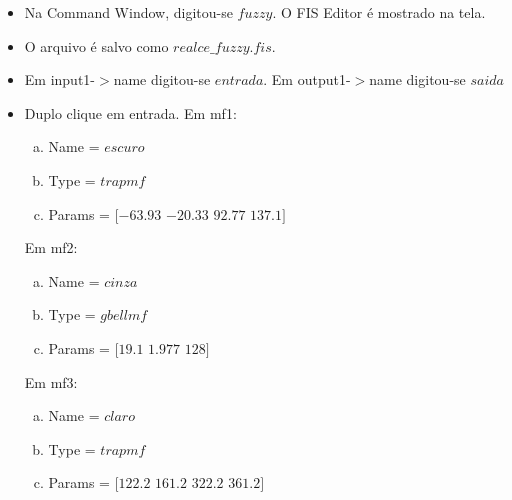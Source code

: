 \documentclass[conference]{IEEEtran}
\begin{document}
\begin{itemize}
	\item Na Command Window, digitou-se $fuzzy$. O FIS Editor \'e mostrado na tela.
	\item O arquivo \'e salvo como $realce\_fuzzy.fis$.
	\item Em input1-$>$name digitou-se $entrada$.  Em output1-$>$name digitou-se $saida$
	\item Duplo clique em entrada. Em mf1: 
		\begin{enumerate}[(a)]
			\item Name = $escuro$
			\item Type = $trapmf$
			\item Params = $[-63.93$ $-20.33$ $92.77$ $137.1]$
		\end{enumerate}
		Em mf2: 
		\begin{enumerate}[(a)]
			\item Name = $cinza$
			\item Type = $gbellmf$
			\item Params = $[19.1$ $1.977$ $128]$
		\end{enumerate}
		Em mf3: 
		\begin{enumerate}[(a)]
			\item Name = $claro$
			\item Type = $trapmf$
			\item Params = $[122.2$ $161.2$ $322.2$ $361.2]$
		\end{enumerate}
   

\end{itemize}
\end{document}
